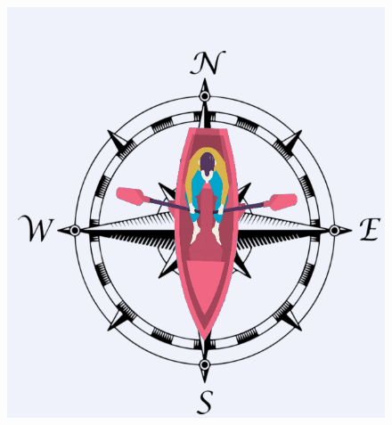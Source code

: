 \begin{figure}[H]
	\centering
	\begin{minipage}[c]{0.55\textwidth}
	\includegraphics[width=\textwidth]{Figures/compass.png}
	\label{feedback-compass}
	\end{minipage}
	~
	\begin{minipage}[c]{0.35\textwidth}

\end{minipage}
\end{figure}
